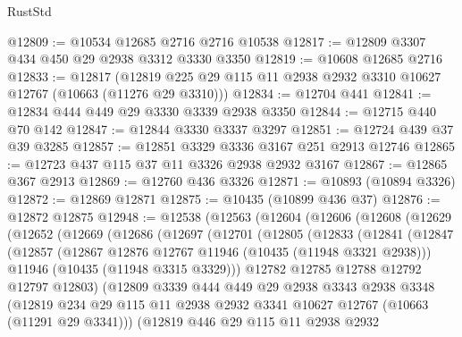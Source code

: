 \begin{lexlean}{RustStd}
\begin{coremodule}
{\begin{coremodule}
{{{{{{{{{{{{{{{{{{{{{{{{{{{{{{{{{{{{{{{{{{{{{{{{{{{{{{{{{{{{{{{{{{{{{{{{{{{{{{@12809 := @10534 @12685 @2716 @2716 @10538
@12817 := @12809 @3307 @434 @450 @29 @2938 @3312 @3330 @3350
@12819 := @10608 @12685 @2716
@12833 := @12817
    (@12819 @225 @29 @115 @11 @2938 @2932 @3310 @10627 @12767 (@10663 (@11276 @29 @3310)))
@12834 := @12704 @441
@12841 := @12834 @444 @449 @29 @3330 @3339 @2938 @3350
@12844 := @12715 @440 @70 @142
@12847 := @12844 @3330 @3337 @3297
@12851 := @12724 @439 @37 @39 @3285
@12857 := @12851 @3329 @3336 @3167 @251 @2913 @12746
@12865 := @12723 @437 @115 @37 @11 @3326 @2938 @2932 @3167
@12867 := @12865 @367 @2913
@12869 := @12760 @436 @3326
@12871 := @10893 (@10894 @3326)
@12872 := @12869 @12871
@12875 := @10435 (@10899 @436 @37)
@12876 := @12872 @12875
@12948 := @12538
    (@12563
      (@12604
        (@12606
          (@12608
            (@12629
              (@12652
                (@12669
                  (@12686
                    (@12697
                      (@12701
                        (@12805
                          (@12833
                            (@12841
                              (@12847
                                (@12857
                                  (@12867 @12876 @12767 @11946 (@10435 (@11948 @3321 @2938)))
                                  @11946
                                  (@10435 (@11948 @3315 @3329)))
                                @12782
                                @12785
                                @12788
                                @12792
                                @12797
                                @12803)
                              (@12809
                                @3339
                                @444
                                @449
                                @29
                                @2938
                                @3343
                                @2938
                                @3348
                                (@12819
                                  @234
                                  @29
                                  @115
                                  @11
                                  @2938
                                  @2932
                                  @3341
                                  @10627
                                  @12767
                                  (@10663 (@11291 @29 @3341)))
                                (@12819
                                  @446
                                  @29
                                  @115
                                  @11
                                  @2938
                                  @2932
}}}}}}}}}}}}}}}}}}}}}}}}}}}}}}}}}}}}}}}}}}}}}}}}}}}}}}}}}}}}}}}}}}}}}}}}}}}}}}
\end{coremodule}}
\end{coremodule}
\end{lexlean}
